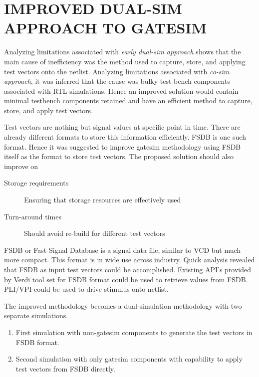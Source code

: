 \chapter{IMPROVED DUAL-SIM APPROACH TO GATESIM}
\label{chap:dualsim.tex}
Analyzing limitations associated with \emph{early dual-sim approach} shows that the main cause of inefficiency was the method used to capture, store, and applying test vectors onto the netlist. Analyzing limitations associated with \emph{co-sim approach}, it was inferred that the cause was bulky test-bench components associated with RTL simulations. Hence an improved solution would contain minimal testbench components retained and have an efficient method to capture, store, and apply test vectors. 

Test vectors are nothing but signal values at specific point in time. There are already different formats to store this information efficiently. FSDB  is one such format. Hence it was suggested to improve gatesim methodology using FSDB itself as the format to store test vectors. The proposed solution should also improve on

\begin{description}
	\item[Storage requirements] Ensuring that storage resources are effectively used
	\item[Turn-around times] Should avoid re-build for different test vectors
\end{description}

FSDB\cite{SS:Verdi} or Fast Signal Database is a signal data file, similar to VCD\cite{ieee:v:2005}  but much more compact. This format is in wide use across industry. Quick analysis revealed that FSDB as input test vectors could be accomplished. Existing API's  provided by Verdi\cite{SS:Verdi} tool set for FSDB format could be used to retrieve values from FSDB. PLI$/$VPI\cite{ieee:v:2005} could be used to drive stimulus onto netlist.


The improved methodology becomes a dual-simulation methodology with two separate simulations.
\begin{enumerate}
	\item First simulation with non-gatesim components to generate the test vectors in FSDB format.
	\item Second simulation with only gatesim components with capability to apply test vectors from FSDB directly.
\end{enumerate}



